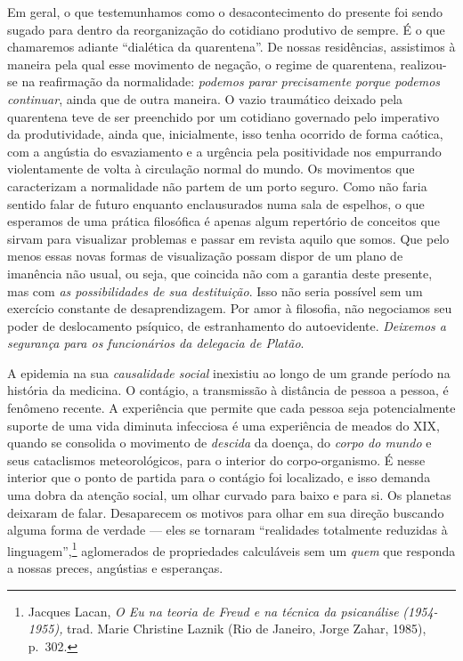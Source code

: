 Em geral, o que testemunhamos como o desacontecimento do presente foi
sendo sugado para dentro da reorganização do cotidiano produtivo de
sempre. É o que chamaremos adiante ``dialética da quarentena''. De
nossas residências, assistimos à maneira pela qual esse movimento de
negação, o regime de quarentena, realizou-se na reafirmação da
normalidade: \emph{podemos parar precisamente porque podemos continuar},
ainda que de outra maneira. O vazio traumático deixado pela quarentena
teve de ser preenchido por um cotidiano governado pelo imperativo da
produtividade, ainda que, inicialmente, isso tenha ocorrido de forma
caótica, com a angústia do esvaziamento e a urgência pela positividade
nos empurrando violentamente de volta à circulação normal do mundo. Os
movimentos que caracterizam a normalidade não partem de um porto seguro.
Como não faria sentido falar de futuro enquanto enclausurados numa sala
de espelhos, o que esperamos de uma prática filosófica é apenas algum
repertório de conceitos que sirvam para visualizar problemas e passar em
revista aquilo que somos. Que pelo menos essas novas formas de
visualização possam dispor de um plano de imanência não usual, ou seja,
que coincida não com a garantia deste presente, mas com \emph{as
possibilidades de sua destituição}. Isso não seria possível sem um
exercício constante de desaprendizagem. Por amor à filosofia, não
negociamos seu poder de deslocamento psíquico, de estranhamento do
autoevidente. \emph{Deixemos a segurança para os funcionários da
delegacia de Platão}.

A epidemia na sua \emph{causalidade social} inexistiu ao longo de um
grande período na história da medicina. O contágio, a transmissão à
distância de pessoa a pessoa, é fenômeno recente. A experiência que
permite que cada pessoa seja potencialmente suporte de uma vida diminuta
infecciosa é uma experiência de meados do XIX, quando se consolida o
movimento de \emph{descida} da doença, do \emph{corpo do mundo} e seus
cataclismos meteorológicos, para o interior do corpo-organismo. É nesse
interior que o ponto de partida para o contágio foi localizado, e isso
demanda uma dobra da atenção social, um olhar curvado para baixo e para
si. Os planetas deixaram de falar. Desaparecem os motivos para olhar em
sua direção buscando alguma forma de verdade --- eles se tornaram
``realidades totalmente reduzidas à linguagem'',\footnote{Jacques Lacan,
  \emph{O Eu na teoria de Freud e na técnica da psicanálise}
  \emph{(1954-1955),} trad. Marie Christine Laznik (Rio de Janeiro,
  Jorge Zahar, 1985), p.~302.} aglomerados de propriedades calculáveis
sem um \emph{quem} que responda a nossas preces, angústias e esperanças.


